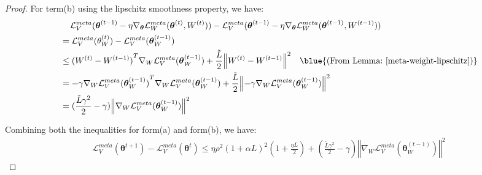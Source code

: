 \begin{proof}
For term(b) using the lipschitz smoothness property, we have:
\begin{align}
&\hspace{0.4cm}\mathcal{L}_V^{meta}(\boldsymbol{\theta}^{(t-1)} - \eta\nabla_{\boldsymbol{\theta}}\mathcal{L}_W^{meta}(\boldsymbol{\theta}^{(t)}, W^{(t)})) - \mathcal{L}_V^{meta}(\boldsymbol{\theta}^{(t-1)} - \eta\nabla_{\boldsymbol{\theta}}\mathcal{L}_W^{meta}(\boldsymbol{\theta}^{(t-1)}, W^{(t-1)})) \\
&= \mathcal{L}_V^{meta}(\theta_W^{(t)}) - \mathcal{L}_V^{meta}(\boldsymbol{\theta}_W^{(t-1)}) \\
&\leq {(W^{(t)} - W^{(t-1)})}^{T} \nabla_W \mathcal{L}_V^{meta}(\boldsymbol{\theta}_W^{(t-1)}) + \frac{\tilde{L}}{2}{\left\Vert W^{(t)} - W^{(t-1)}\right\Vert}^2 \quad \blue{\text{(From Lemma:~\ref{meta-weight-lipschitz})}} \nonumber\\
&= {-\gamma \nabla_W \mathcal{L}_V^{meta}(\boldsymbol{\theta}_W^{(t-1)})}^{T} \nabla_W \mathcal{L}_V^{meta}(\boldsymbol{\theta}_W^{(t-1)}) + \frac{\tilde{L}}{2}{\left\Vert -\gamma \nabla_W \mathcal{L}_V^{meta}(\boldsymbol{\theta}_W^{(t-1)})\right\Vert}^2\\
&= (\frac{\tilde{L}\gamma^2}{2} - \gamma){\left\Vert \nabla_W \mathcal{L}_V^{meta}(\boldsymbol{\theta}_W^{(t-1)})\right\Vert}^2
\end{align}

Combining both the inequalities for form(a) and form(b), we have:
\begin{equation}
    \begin{aligned}
        \mathcal{L}_V^{meta}(\boldsymbol{\theta}^{t+1}) - \mathcal{L}_V^{meta}(\boldsymbol{\theta}^{t}) \leq \eta {\rho}^2{(1+\alpha L)}^2 (1 + \frac{\eta L}{2}) + (\frac{\tilde{L}\gamma^2}{2} - \gamma){\left\Vert \nabla_W \mathcal{L}_V^{meta}(\boldsymbol{\theta}_W^{(t-1)})\right\Vert}^2
    \end{aligned}
\end{equation}


\end{proof}
